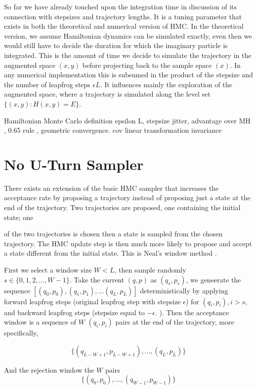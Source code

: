 \documentclass[]{report}
\begin{document}
So far we have already touched upon the integration time in discussion of
its connection with stepsizes and trajectory lengths. It is a tuning parameter
that exists in both the theoretical and numerical version of HMC. In the
theoretical version, we assume Hamiltonian dynamics can be simulated exactly,
even then we would still have to decide the duration for which the imaginary
particle is integrated. This
is the amount of time we decide to simulate the trajectory in the augmented
space $(x,y)$ before projecting back to the sample space $(x)$. In any
numerical implementation this is subsumed in the product of the stepsize and the
number of leapfrog steps $\epsilon L$. It influences mainly the exploration of
the augmented space, where a trajectory is simulated along the level set
$\{(x,y):H(x,y)=E\}$.




Hamiltonian Monte Carlo 
definition epsilon L, stepsize jitter, advantage over MH , 0.65 rule , geometric convergence. cov linear transformation invariance 


\section{No U-Turn Sampler}


There exists an extension of the basic HMC sampler that increases the acceptance
rate by proposing a trajectory instead of proposing just a state at the end
of the trajectory. Two trajectories are proposed, one containing the initial state; one

of the two trajectories is chosen then a state is sampled from the chosen
trajectory. The HMC update step is then much more likely to propose and accept
a state different from the initial state. This is Neal's window
method \cite{neal1992improved}. 

First we select a window size $W < L$, then sample randomly $s \in \{0, 1,2 , \dots , W -1 \}$. Take the current $(q,p)$ as $(q_s, p_s)$, we geneerate the sequence $[(q_0,p_0),(q_1, p_1), \dots (q_L,p_L)]$ deterministically by applying forward leapfrog steps (original leapfrog step with stepsize $\epsilon$) for $(q_i,p_i), i > s $, and backward leapfrog steps (stepsize equal to $-\epsilon$. ). 
Then the acceptance window is a sequence of $W$ $(q_i,p_i)$ pairs at the end of the trajectory, more specifically,

\[ \{(q_{L-W+1},p_{L-W+1}), \dots , (q_L,p_L)\} \]

And the rejection window the $W$ pairs 
\[ \{(q_0,p_0), \dots, (q_{W-1},p_{W-1})\} \]
\end{document}
